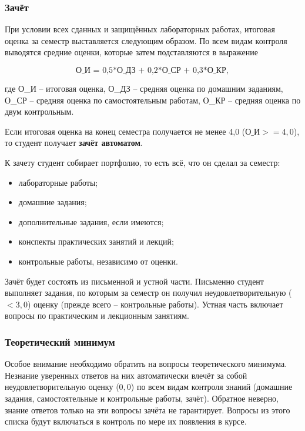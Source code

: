 \documentclass[11pt, a4paper]{article}
\theoremstyle{plain}
\theoremstyle{definition}
\theoremstyle{remark}
\begin{document}
\subsubsection{Зачёт}
При условии всех сданных и защищённых лабораторных работах, итоговая оценка за семестр выставляется
следующим образом. По всем видам контроля выводятся средние оценки, которые затем подставляются в
выражение

\begin{equation*}
    \text{О\_И = 0,5*О\_ДЗ + 0,2*О\_СР + 0,3*О\_КР},
\end{equation*}

где О\_И – итоговая оценка, О\_ДЗ – средняя оценка по домашним заданиям, О\_СР – средняя оценка по
самостоятельным работам, О\_КР – средняя оценка по двум контрольным.

Если итоговая оценка на конец семестра получается не менее 4,0 ($\text{О\_И} >= 4,0$), то студент получает
\textbf{зачёт автоматом}. 

К зачету студент собирает портфолио, то есть всё, что он сделал за семестр:
\begin{itemize}
    \item лабораторные работы;
    \item домашние задания;
    \item дополнительные задания, если имеются;
    \item конспекты практических занятий и лекций;
    \item контрольные работы, независимо от оценки.
\end{itemize}

Зачёт будет состоять из письменной и устной части. Письменно студент выполняет задания, по
которым за семестр он получил неудовлетворительную ($< 3,0$) оценку (прежде всего -- контрольные
работы). Устная часть включает вопросы по практическим и лекционным занятиям.

\subsubsection{Теоретический минимум}
Особое внимание необходимо обратить на вопросы теоретического минимума. Незнание уверенных
ответов на них автоматически влечёт за собой неудовлетворительную оценку ($0,0$) по всем видам
контроля знаний (домашние задания, самостоятельные и контрольные работы, зачёт). Обратное неверно,
знание ответов только на эти вопросы зачёта не гарантирует. Вопросы из этого списка будут
включаться в контроль по мере их появления в курсе.
\end{document}

